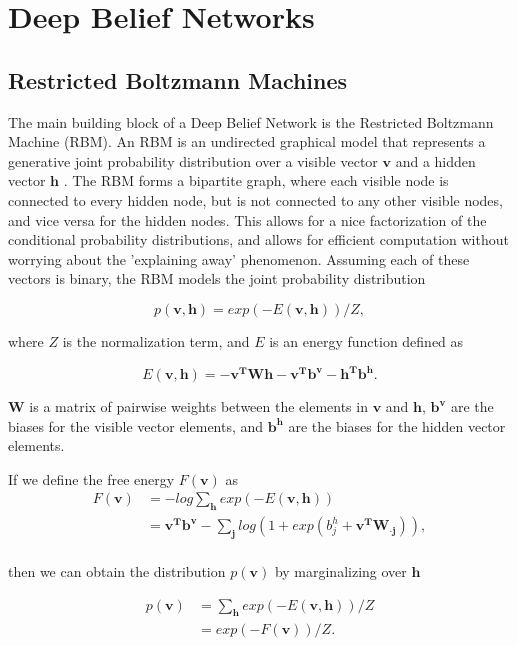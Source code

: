 \documentclass{article}
\begin{document}
\section{Deep Belief Networks}

\subsection{Restricted Boltzmann Machines}

The main building block of a Deep Belief Network is the Restricted Boltzmann
Machine (RBM). An RBM is an undirected graphical model that represents a
generative joint probability distribution over a visible vector $\mathbf{v}$
and a hidden vector $\mathbf{h}$ \cite{mnih2012conditional}. The RBM forms a
bipartite graph, where each visible node is connected to every hidden node, but
is not connected to any other visible nodes, and vice versa for the hidden
nodes.  This allows for a nice factorization of the conditional probability
distributions, and allows for efficient computation without worrying about the
'explaining away' phenomenon. Assuming each of these vectors is binary,
the RBM models the joint probability distribution

\[
  p \left( \mathbf{v}, \mathbf{h} \right) = 
  exp \left(-E \left( \mathbf{v}, \mathbf{h} \right) \right) / Z,
\]

where $Z$ is the normalization term, and $E$ is an energy function defined as

\[
  E \left( \mathbf{v}, \mathbf{h} \right) = 
  - \mathbf{v^TWh} - \mathbf{v^Tb^v} - \mathbf{h^Tb^h}.
\]

$\mathbf{W}$ is a matrix of pairwise weights between the elements in 
$\mathbf{v}$ and $\mathbf{h}$, $\mathbf{b^v}$ are the biases for the visible
vector elements, and $\mathbf{b^h}$ are the biases for the hidden vector
elements.

If we define the free energy $F(\mathbf{v})$ as
\begin{align*}
  F \left( \mathbf{v} \right) &= -log \sum_{\mathbf{h}} exp \left( -E \left( \mathbf{v,h} \right) \right) \\
  &= \mathbf{v^Tb^v} - \sum_{\mathbf{j}} log
    \left(
      1 + exp \left( b_j^h + \mathbf{v^TW_{\cdot j}} \right)
    \right), \\
\end{align*}

then we can obtain the distribution $p(\mathbf{v})$ by marginalizing over
$\mathbf{h}$

\begin{align*}
  p(\mathbf{v}) &= \sum_{\mathbf{h}} exp(-E(\mathbf{v, h})) / Z \\
                &= exp(-F(\mathbf{v})) / Z. \\
\end{align*}
\end{document}

